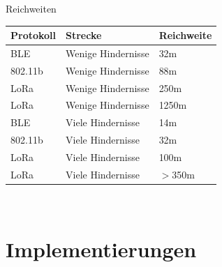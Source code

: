 \documentclass[18pt]{beamer}
\begin{document}
\begin{frame}{Reichweiten}
	\centering
	\begin{tabular}{l|l|l}
		Protokoll & Strecke & Reichweite \\
		\hline
		BLE & Wenige Hindernisse & 32m \\
		802.11b & Wenige Hindernisse & 88m \\
		LoRa & Wenige Hindernisse & 250m \\
		LoRa & Wenige Hindernisse & 1250m \\
		\hline
		BLE & Viele Hindernisse & 14m \\
		802.11b & Viele Hindernisse & 32m \\
		LoRa & Viele Hindernisse & 100m \\
		LoRa & Viele Hindernisse & $>$350m \\
	\end{tabular}\\
\end{frame}

\section{Implementierungen}
\end{document}

